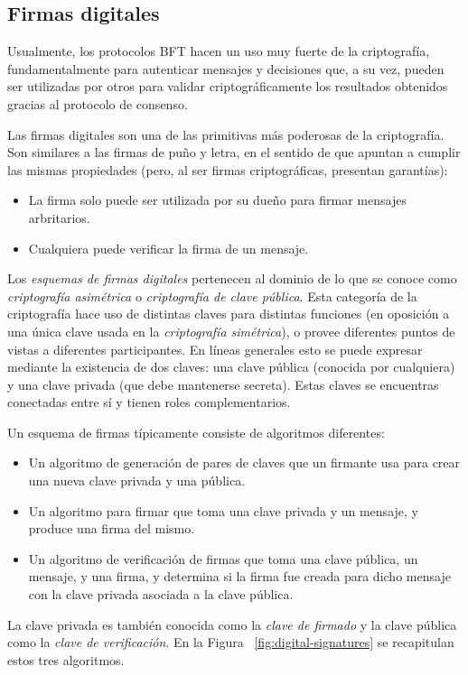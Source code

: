 \subsection{Firmas digitales}
Usualmente, los protocolos BFT hacen un uso muy fuerte de la criptografía, fundamentalmente para autenticar
mensajes y decisiones que, a su vez, pueden ser utilizadas por otros para validar criptográficamente los resultados
obtenidos gracias al protocolo de consenso.

%
Las firmas digitales son una de las primitivas más poderosas de la criptografía.
Son similares a las firmas de puño y letra, en el sentido de que apuntan a cumplir las mismas propiedades
(pero, al ser firmas criptográficas, presentan garantías):
\begin{itemize}
  \item La firma solo puede ser utilizada por su dueño para firmar mensajes arbritarios.
  \item Cualquiera puede verificar la firma de un mensaje.
\end{itemize}
 
Los \textit{esquemas de firmas digitales} pertenecen al dominio de lo que se conoce como \textit{criptografía asimétrica}
o \textit{criptografía de clave pública}.
%
Esta categoría de la criptografía hace uso de distintas claves para distintas funciones (en oposición a una única
clave usada en la \textit{criptografía simétrica}), o provee diferentes puntos de vistas a diferentes participantes.
%
En líneas generales esto se puede expresar mediante la existencia de dos claves: una clave pública (conocida por cualquiera)
y una clave privada (que debe mantenerse secreta). Estas claves se encuentras conectadas entre sí y tienen roles complementarios.


Un esquema de firmas típicamente consiste de algoritmos diferentes:
\begin{itemize}
  \item Un algoritmo de generación de pares de claves que un firmante usa para crear una nueva clave privada y una pública.
  \item Un algoritmo para firmar que toma una clave privada y un mensaje, y produce una firma del mismo.
  \item Un algoritmo de verificación de firmas que toma una clave pública, un mensaje, y una firma, y determina si la firma
  fue creada para dicho mensaje con la clave privada asociada a la clave pública. 
\end{itemize}

La clave privada es también conocida como la \textit{clave de firmado} y la clave pública como la \textit{clave de verificación}.
En la Figura ~\ref{fig:digital-signatures} se recapitulan estos tres algoritmos.

